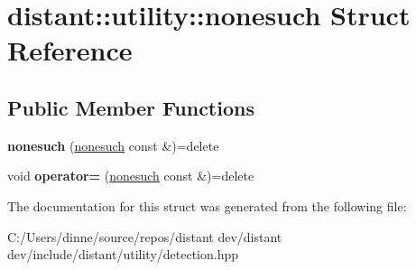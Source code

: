 \hypertarget{structdistant_1_1utility_1_1nonesuch}{}\section{distant\+:\+:utility\+:\+:nonesuch Struct Reference}
\label{structdistant_1_1utility_1_1nonesuch}
\subsection*{Public Member Functions}
\begin{DoxyCompactItemize}
\item 
\mbox{\label{structdistant_1_1utility_1_1nonesuch_ab87b667a897c87a848f88efefc4b64ca}} 
{\bfseries nonesuch} (\mbox{\hyperlink{structdistant_1_1utility_1_1nonesuch}{nonesuch}} const \&)=delete
\item 
\mbox{\label{structdistant_1_1utility_1_1nonesuch_a1de338739dd272f2e6044f06190b0b38}} 
void {\bfseries operator=} (\mbox{\hyperlink{structdistant_1_1utility_1_1nonesuch}{nonesuch}} const \&)=delete
\end{DoxyCompactItemize}


The documentation for this struct was generated from the following file\+:\begin{DoxyCompactItemize}
\item 
C\+:/\+Users/dinne/source/repos/distant dev/distant dev/include/distant/utility/detection.\+hpp\end{DoxyCompactItemize}
